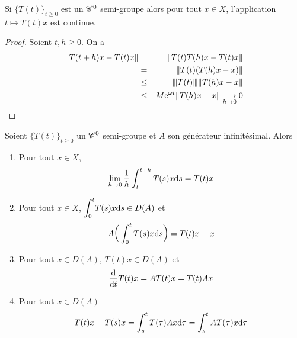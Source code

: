 \begin{corollaire}
    Si $\big\{T(t)\big\}_{t \geq 0}$ est un $\mathscr{C}^0$ semi-groupe alors pour tout $x \in X$, l'application $t \mapsto T(t)x$ est continue.
\end{corollaire}

\begin{proof}
    Soient $t,h \geq 0$. On a 
    \begin{eqnarray*}
        \|T(t+h)x-T(t)x\| &=& \|T(t)T(h)x-T(t)x\| \\
        &=&\|T(t)(T(h)x-x)\| \\
        &\leq& {\left\vert\kern-0.25ex\left\vert \kern-0.25ex\left\vert T(t) \right\vert\kern-0.25ex\right\vert\kern-0.25ex\right\vert}\|T(h)x-x\| \\
        &\leq& M\mathrm{e}^{\omega t} \|T(h)x-x\| \underset{h \to 0}{\longrightarrow} 0
    \end{eqnarray*}
\end{proof}

\begin{theorem}\label{proprietes_SG}
    Soient $\big\{T(t)\big\}_{t \geq 0}$ un $\mathscr{C}^0$ semi-groupe et $A$ son générateur infinitésimal. Alors 
    \begin{enumerate}
        \item Pour tout $x \in X$, 
        \begin{equation*}
            \lim_{h \to 0} \frac{1}{h}\int_t^{t+h}T(s)x\mathrm{d} s = T(t)x
        \end{equation*}
        \item Pour tout $x \in X$, $\displaystyle{\int_0^t}T(s)x\mathrm{d} s \in D(A)$ et 
        \begin{equation*}
            A\bigg(\int_0^t T(s)x\mathrm{d} s\bigg) = T(t)x-x
        \end{equation*}
        \item Pour tout $x \in D(A)$, $T(t)x \in D(A)$ et 
        \begin{equation*}
            \frac{\mathrm{d}}{\mathrm{d} t}T(t)x = AT(t)x=T(t)Ax
        \end{equation*}
        \item Pour tout $x \in D(A)$
        \begin{equation*}
            T(t)x-T(s)x = \int_s^tT(\tau)Ax\mathrm{d} \tau = \int_s^t AT(\tau)x\mathrm{d} \tau
        \end{equation*}
    \end{enumerate}
\end{theorem}

